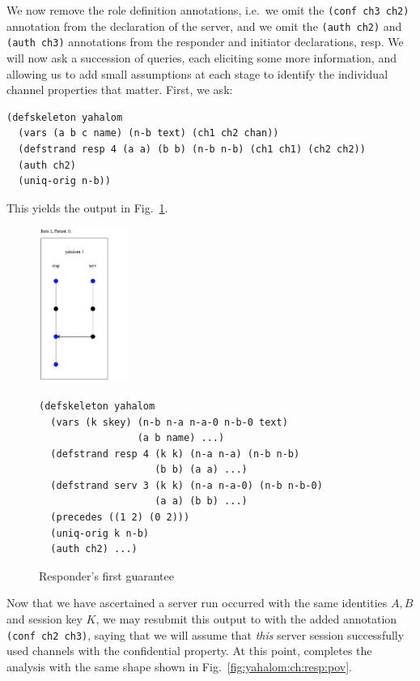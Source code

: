 We now remove the role definition annotations, i.e.~we omit the
\texttt{(conf ch3 ch2)} annotation from the declaration of the server,
and we omit the \texttt{(auth ch2)} and \texttt{(auth ch3)}
annotations from the responder and initiator declarations, resp.  We
will now ask a succession of queries, each eliciting some more
information, and allowing us to add small assumptions at each stage to
identify the individual channel properties that matter.  First, we
ask:
%
{\small
\begin{verbatim}(defskeleton yahalom
  (vars (a b c name) (n-b text) (ch1 ch2 chan))
  (defstrand resp 4 (a a) (b b) (n-b n-b) (ch1 ch1) (ch2 ch2))
  (auth ch2)   
  (uniq-orig n-b))\end{verbatim}}
%
This yields the output in Fig.~\ref{fig:yahalom:q:resp:pov:1}.
%
\begin{figure}
  \begin{minipage}[c][2in][c]{.25\linewidth}
    \includegraphics[height=2in]{yahalom_q_resp_pov1.png}
  \end{minipage}
  \begin{minipage}[c][2in][c]{.7\linewidth}\small
\begin{verbatim}(defskeleton yahalom
  (vars (k skey) (n-b n-a n-a-0 n-b-0 text)
                 (a b name) ...)
  (defstrand resp 4 (k k) (n-a n-a) (n-b n-b)
                    (b b) (a a) ...)
  (defstrand serv 3 (k k) (n-a n-a-0) (n-b n-b-0)
                    (a a) (b b) ...)
  (precedes ((1 2) (0 2)))
  (uniq-orig k n-b)
  (auth ch2) ...) \end{verbatim}
  \end{minipage}
  \caption{Responder's first guarantee}
  \label{fig:yahalom:q:resp:pov:1}
\end{figure}

Now that we have ascertained a server run occurred with the same
identities $A,B$ and session key $K$, we may resubmit this output to
{\cpsa} with the added annotation \texttt{(conf ch2 ch3)}, saying that
we will assume that \emph{this} server session successfully used
channels with the confidential property.  At this point, {\cpsa}
completes the analysis with the same shape shown in
Fig.~\ref{fig:yahalom:ch:resp:pov}.

